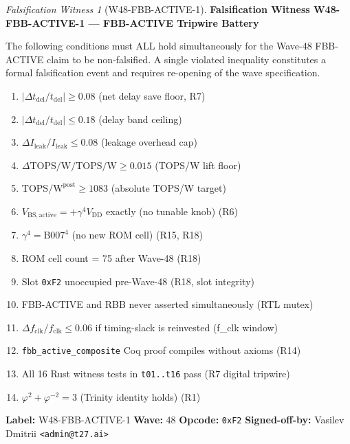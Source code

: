 \documentclass[12pt,a4paper]{report}
\theoremstyle{plain}
\theoremstyle{definition}
\theoremstyle{remark}
\newtheorem{witness}{Falsification Witness}
\newcommand{\opcode}[1]{\texttt{#1}}
\newcommand{\vbs}{V_{\mathrm{BS,active}}}
\newcommand{\vdd}{V_{\mathrm{DD}}}
\newcommand{\gammaFour}{\gamma^{4}}
\newcommand{\topsw}{\mathrm{TOPS/W}}
\newcommand{\fclk}{f_{\mathrm{clk}}}
\newcommand{\tdel}{t_{\mathrm{del}}}
\begin{document}
\begin{witness}[W48-FBB-ACTIVE-1]
\label{wit:fbb_active_1}
\textbf{Falsification Witness W48-FBB-ACTIVE-1 — FBB-ACTIVE Tripwire Battery}

\noindent The following conditions must ALL hold simultaneously for the Wave-48 FBB-ACTIVE claim
to be non-falsified.  A single violated inequality constitutes a formal falsification event and
requires re-opening of the wave specification.

\begin{enumerate}[label=\textbf{T\arabic*.}]
  \item $|\Delta \tdel / \tdel| \geq 0.08$ \hfill (net delay save floor, R7)
  \item $|\Delta \tdel / \tdel| \leq 0.18$ \hfill (delay band ceiling)
  \item $\Delta I_{\mathrm{leak}} / I_{\mathrm{leak}} \leq 0.08$ \hfill (leakage overhead cap)
  \item $\Delta \topsw / \topsw \geq 0.015$ \hfill (TOPS/W lift floor)
  \item $\topsw^{\mathrm{post}} \geq 1083$ \hfill (absolute TOPS/W target)
  \item $\vbs = +\gammaFour \vdd$ exactly (no tunable knob) \hfill (R6)
  \item $\gammaFour = \mathrm{B007}^{4}$ (no new ROM cell) \hfill (R15, R18)
  \item ROM cell count = 75 after Wave-48 \hfill (R18)
  \item Slot \opcode{0xF2} unoccupied pre-Wave-48 \hfill (R18, slot integrity)
  \item FBB-ACTIVE and RBB never asserted simultaneously \hfill (RTL mutex)
  \item $\Delta \fclk / \fclk \leq 0.06$ if timing-slack is reinvested \hfill (f\_clk window)
  \item \texttt{fbb\_active\_composite} Coq proof compiles without axioms \hfill (R14)
  \item All 16 Rust witness tests in \texttt{t01..t16} pass \hfill (R7 digital tripwire)
  \item $\varphi^{2} + \varphi^{-2} = 3$ (Trinity identity holds) \hfill (R1)
\end{enumerate}

\noindent\textbf{Label:} W48-FBB-ACTIVE-1 \quad
\textbf{Wave:} 48 \quad
\textbf{Opcode:} \opcode{0xF2} \quad
\textbf{Signed-off-by:} Vasilev Dmitrii \texttt{<admin@t27.ai>}
\end{witness}
\end{document}
